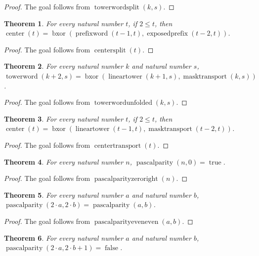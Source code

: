 \documentclass[11pt]{article}
\newtheorem{theorem}{Theorem}[section]
\theoremstyle{definition}
\begin{document}
\begin{proof}
The goal follows from \(\operatorname{towerwordsplit}(k, s)\).
\end{proof}
\begin{theorem}
\label{ll:observations:center-split}
For every natural number \(t\), if \(2 \le t\), then \(\operatorname{center}(t) = \operatorname{bxor}(\operatorname{prefixword}(t - 1, t), \operatorname{exposedprefix}(t - 2, t))\).
\end{theorem}
\begin{proof}
The goal follows from \(\operatorname{centersplit}(t)\).
\end{proof}
\begin{theorem}
\label{ll:observations:tower-word-unfolded}
For every natural number \(k\) and natural number \(s\), \(\operatorname{towerword}(k + 2, s) = \operatorname{bxor}(\operatorname{lineartower}(k + 1, s), \operatorname{masktransport}(k, s))\).
\end{theorem}
\begin{proof}
The goal follows from \(\operatorname{towerwordunfolded}(k, s)\).
\end{proof}
\begin{theorem}
\label{ll:observations:center-transport}
For every natural number \(t\), if \(2 \le t\), then \(\operatorname{center}(t) = \operatorname{bxor}(\operatorname{lineartower}(t - 1, t), \operatorname{masktransport}(t - 2, t))\).
\end{theorem}
\begin{proof}
The goal follows from \(\operatorname{centertransport}(t)\).
\end{proof}
\begin{theorem}
\label{ll:observations:pascal-parity-zero-right}
For every natural number \(n\), \(\operatorname{pascalparity}(n, 0) = \operatorname{true}\).
\end{theorem}
\begin{proof}
The goal follows from \(\operatorname{pascalparityzeroright}(n)\).
\end{proof}
\begin{theorem}
\label{ll:observations:pascal-parity-even-even}
For every natural number \(a\) and natural number \(b\), \(\operatorname{pascalparity}(2 \cdot a, 2 \cdot b) = \operatorname{pascalparity}(a, b)\).
\end{theorem}
\begin{proof}
The goal follows from \(\operatorname{pascalparityeveneven}(a, b)\).
\end{proof}
\begin{theorem}
\label{ll:observations:pascal-parity-even-odd}
For every natural number \(a\) and natural number \(b\), \(\operatorname{pascalparity}(2 \cdot a, 2 \cdot b + 1) = \operatorname{false}\).
\end{theorem}
\end{document}
